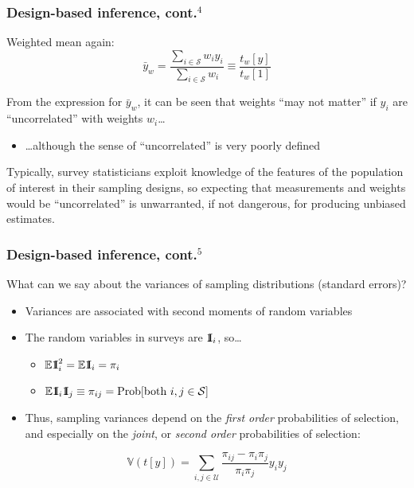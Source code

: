 \documentclass[handout]{beamer}
\newcommand{\Expect}{\mathbb{E}}
\newcommand{\Var}{\mathbb{V}}
\newcommand{\One}{{\rm 1\kern-0.3em I}}
\begin{document}
\begin{frame}\frametitle{Design-based inference, cont.$^4$}

Weighted mean again:
$$ \bar y_w = \frac{\sum_{i\in\mathcal{S}} w_i y_i}{\sum_{i\in\mathcal{S}} w_i} \equiv \frac{t_w[y]}{t_w[1]} $$

\bigskip

From the expression for $\bar y_w$, it can be seen that weights ``may not matter'' 
if $y_i$ are ``uncorrelated'' with weights $w_i$\ldots
\begin{itemize}
    \item \ldots although the sense of ``uncorrelated'' is very poorly defined
\end{itemize}
Typically, survey statisticians exploit knowledge of the features of the population of interest
in their sampling designs, so expecting that measurements and weights would be ``uncorrelated'' is
unwarranted, if not dangerous, for producing unbiased estimates.

\end{frame}

\begin{frame}\frametitle{Design-based inference, cont.$^5$}

What can we say about the variances of sampling distributions (standard errors)?

\begin{itemize}
    \item Variances are associated with second moments of random variables
    \item The random variables in surveys are $\One_i$, so\ldots
        \begin{itemize}
            \item $\Expect \One_i^2 = \Expect \One_i = \pi_i$
            \item $\Expect \One_i \One_j \equiv \pi_{ij} = {\rm Prob}[\mbox{both }i,j \in \mathcal{S}]$
        \end{itemize}
    \item Thus, sampling variances depend on the \textit{first order}
        probabilities of selection, and especially on the
        \textit{joint}, or \textit{second order} probabilities of selection:
\end{itemize}

$$
\Var( t[y] ) = \sum_{i, j\in\mathcal{U}} \frac{\pi_{ij}-\pi_i \pi_j}{\pi_i \pi_j} y_i y_j
$$

\end{frame}
\end{document}
